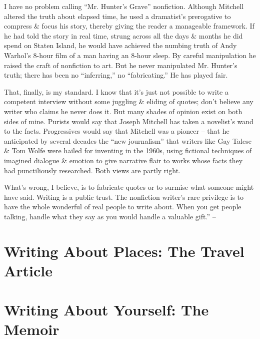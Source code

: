\documentclass{article}
\begin{document}
I have no problem calling ``Mr. Hunter's Grave'' nonfiction. Although Mitchell altered the truth about elapsed time, he used a dramatist's prerogative to compress \& focus his story, thereby giving the reader a manageable framework. If he had told the story in real time, strung across all the days \& months he did spend on Staten Island, he would have achieved the numbing truth of Andy Warhol's 8-hour film of a man having an 8-hour sleep. By careful manipulation he raised the craft of nonfiction to art. But he never manipulated Mr. Hunter's truth; there has been no ``inferring,'' no ``fabricating.'' He has played fair.

That, finally, is my standard. I know that it's just not possible to write a competent interview without some juggling \& eliding of quotes; don't believe any writer who claims he never does it. But many shades of opinion exist on both sides of mine. Purists would say that Joseph Mitchell has taken a novelist's wand to the facts. Progressives would say that Mitchell was a pioneer -- that he anticipated by several decades the ``new journalism'' that writers like Gay Talese \& Tom Wolfe were hailed for inventing in the 1960s, using fictional techniques of imagined dialogue \& emotion to give narrative flair to works whose facts they had punctiliously researched. Both views are partly right.

What's wrong, I believe, is to fabricate quotes or to surmise what someone might have said. Writing is a public trust. The nonfiction writer's rare privilege is to have the whole wonderful of real people to write about. When you get people talking, handle what they say as you would handle a valuable gift.'' -- \cite[pp. 98--111]{Zinsser2016}


\section{Writing About Places: The Travel Article}


\section{Writing About Yourself: The Memoir}

\end{document}
